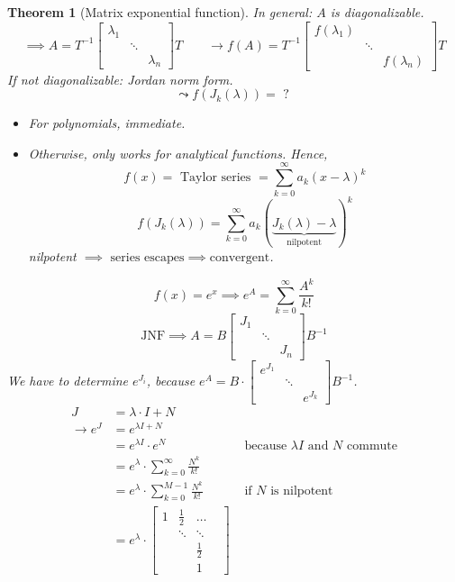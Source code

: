 \documentclass[a4paper]{article}
\newcounter{lecref}[section]
\numberwithin{lecref}{section}
\newtheorem{theorem}[lecref]{Theorem}
\begin{document}
\begin{theorem}[Matrix exponential function] %
  In general: $A$ is diagonalizable.
  \[
    \implies A = T^{-1} \begin{bmatrix} \lambda_1 & & \\ & \ddots & \\ & & \lambda_n \end{bmatrix} T
    \qquad
    \to f(A) = T^{-1} \begin{bmatrix} f(\lambda_1) & & \\ & \ddots & \\ & & f(\lambda_n) \end{bmatrix} T
  \]
  If not diagonalizable: Jordan norm form.
  \[ \leadsto f(J_k(\lambda)) = \text{ ? } \]
  \begin{itemize}
    \item For polynomials, immediate.
    \item Otherwise, only works for analytical functions. Hence,
      \[ f(x) = \text{ Taylor series } = \sum_{k=0}^\infty a_k (x - \lambda)^k \]
      \[ f(J_k(\lambda)) = \sum_{k=0}^\infty a_k (\underbrace{J_k(\lambda) - \lambda}_{\text{nilpotent}})^k \]
      nilpotent $\implies \text{ series escapes} \implies \text{convergent}$.
  \end{itemize}
  \[ f(x) = e^x \implies e^A = \sum_{k=0}^\infty \frac{A^k}{k!} \]
  \[ \text{JNF} \implies A = B \begin{bmatrix} J_1 & & \\ & \ddots & \\ & & J_n \end{bmatrix} B^{-1} \]
  We have to determine $e^{J_i}$, because $e^A = B \cdot \begin{bmatrix} e^{J_1} & & \\ & \ddots & \\ & & e^{J_k} \end{bmatrix} B^{-1}$.
  \begin{align*}
    J &= \lambda \cdot I + N \\
    \to e^{J} &= e^{\lambda I + N} \\
      &= e^{\lambda I} \cdot e^N & \text{ because } \lambda I \text{ and } N \text{ commute} \\
      &= e^{\lambda} \cdot \sum_{k=0}^\infty \frac{N^k}{k!} \\
      &= e^{\lambda} \cdot \sum_{k=0}^{M-1} \frac{N^k}{k!} & \text{ if $N$ is nilpotent} \\
      &= e^{\lambda} \cdot \begin{bmatrix} 1 & \frac12 & \dots & \\ & \ddots & \ddots & \\ & & \frac12 & \\ & & 1 & \end{bmatrix}
  \end{align*}
\end{theorem}
\end{document}
